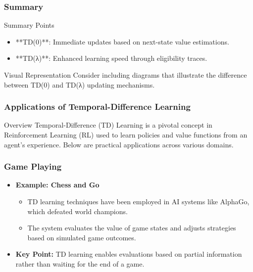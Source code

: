 \documentclass[aspectratio=169]{beamer}
\begin{document}
\begin{frame}[fragile]
    \frametitle{Summary}
    \begin{block}{Summary Points}
        \begin{itemize}
            \item **TD(0)**: Immediate updates based on next-state value estimations.
            \item **TD(λ)**: Enhanced learning speed through eligibility traces.
        \end{itemize}
    \end{block}
    
    \begin{block}{Visual Representation}
        Consider including diagrams that illustrate the difference between TD(0) and TD(λ) updating mechanisms.
    \end{block}
\end{frame}

\begin{frame}[fragile]
    \frametitle{Applications of Temporal-Difference Learning}
    \begin{block}{Overview}
        Temporal-Difference (TD) Learning is a pivotal concept in Reinforcement Learning (RL) used to learn policies and value functions from an agent's experience. Below are practical applications across various domains.
    \end{block}
\end{frame}

\begin{frame}[fragile]
    \frametitle{Game Playing}
    \begin{itemize}
        \item \textbf{Example: Chess and Go}
        \begin{itemize}
            \item TD learning techniques have been employed in AI systems like AlphaGo, which defeated world champions. 
            \item The system evaluates the value of game states and adjusts strategies based on simulated game outcomes.
        \end{itemize}
        \item \textbf{Key Point:} TD learning enables evaluations based on partial information rather than waiting for the end of a game.
    \end{itemize}
\end{frame}
\end{document}
